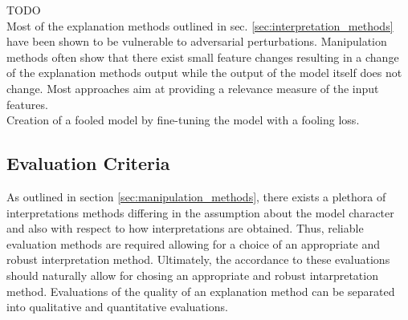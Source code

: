 TODO \\
Most of the explanation methods outlined in sec. \autoref{sec:interpretation_methods} have been shown to be vulnerable to adversarial perturbations. 
Manipulation methods often show that there exist small feature changes resulting in a change of the explanation methods output while the output of the model itself does not change. 
Most approaches aim at providing a relevance measure of the input features. \\



Creation of a fooled model by fine-tuning the model with a fooling loss. 




\subsection{Evaluation Criteria}
\label{subsec:evaluation_criteria}
As outlined in section \autoref{sec:manipulation_methods}, there exists a plethora of interpretations methods differing in the assumption about the model character and also with respect to how interpretations are obtained. Thus, reliable evaluation methods are required allowing for a choice of an appropriate and robust interpretation method. Ultimately, the accordance to these evaluations should naturally allow for chosing an appropriate and robust intarpretation method.  
Evaluations of the quality of an explanation method can be separated into qualitative and quantitative evaluations. 

